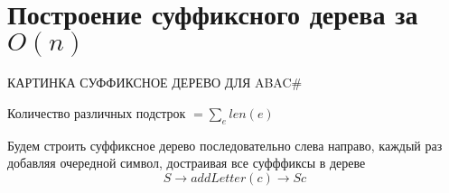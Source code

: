 
\section{Построение суффиксного дерева за $ O(n) $}

КАРТИНКА СУФФИКСНОЕ ДЕРЕВО ДЛЯ ABAC\#\\

\begin{Rem}
	Количество различных подстрок $ = \sum\limits_{e} len(e) $
\end{Rem}

Будем строить суффиксное дерево последовательно слева направо, каждый раз добавляя очередной символ, достраивая все суфффиксы в дереве \\
$$ S \to addLetter(c) \to Sc $$

